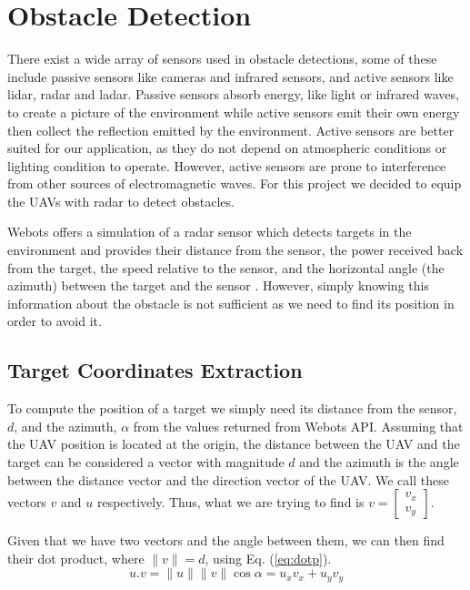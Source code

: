 \section{Obstacle Detection}

There exist a wide array of sensors used in obstacle detections, some of these include passive
sensors like cameras and infrared sensors, and active sensors like lidar, radar and ladar. 
Passive sensors absorb energy, like light or infrared waves, to create a picture of the 
environment while active sensors emit their own energy then collect the reflection emitted
by the environment. Active sensors are better suited for our application, as they do not
depend on atmospheric conditions or lighting condition to operate. However, active sensors
are prone to interference from other sources of electromagnetic waves. \autocite{4432828}
For this project we decided to equip the UAVs with radar to detect obstacles. 

Webots offers a simulation of a radar sensor which detects targets in the environment and 
provides their distance from the sensor, the power received back from the target, the speed relative 
to the sensor, and the horizontal angle (the azimuth) between the target and the sensor \autocite{Webots}.
However, simply knowing this information about the obstacle is not sufficient as we need to find
its position in order to avoid it.

\subsection{Target Coordinates Extraction}

To compute the position of a target we simply need its distance from the sensor, $d$, and the azimuth, 
$\alpha$ from the values returned from Webots API. Assuming that the UAV position is located at the origin,
the distance between the UAV and the target can be considered a vector with magnitude $d$ and the 
azimuth is the angle between the distance vector and the direction vector of the UAV. We call these
vectors $v$ and $u$ respectively. Thus, what we are trying to find is $v = \begin{bmatrix} v_x \\ v_y \end{bmatrix}$.

Given that we have two vectors and the angle between them, we can then find their dot product, where
$\parallel v \parallel = d$, using Eq. (\ref{eq:dotp}).
\begin{equation}
	u . v = \parallel u \parallel \parallel v \parallel \cos \alpha = u_x v_x + u_y v_y
	\label{eq:dotp}
\end{equation}

